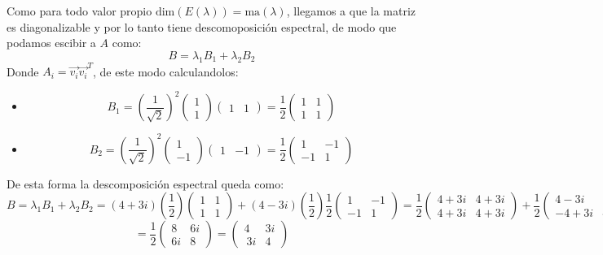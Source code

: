 \begin{itemize}
\begin{itemize}
        
    \end{itemize}
    Como para todo valor propio $\text{dim}(E(\lambda))=\text{ma}(\lambda)$, llegamos a que la matriz es diagonalizable y por lo tanto tiene descomoposici\'on espectral, de modo que podamos escibir a $A$ como:
    \[B=\lambda_1B_1+\lambda_2B_2\]
    Donde $A_i=\vec{v_i}\vec{v_i}^T$, de este modo calculandolos:
    \begin{itemize}
        \item \[B_1=\left(\frac{1}{\sqrt{2}}\right)^2\begin{pmatrix}1\\1\end{pmatrix}\begin{pmatrix}1&1\end{pmatrix}=\frac{1}{2}\begin{pmatrix}1&1\\1&1\end{pmatrix}\]
        \item \[B_2=\left(\frac{1}{\sqrt{2}}\right)^2\begin{pmatrix}1\\-1\end{pmatrix}\begin{pmatrix}1&-1\end{pmatrix}=\frac{1}{2}\begin{pmatrix}1&-1\\-1&1\end{pmatrix}\]
    \end{itemize}
    
    De esta forma la descomposición espectral queda como:\
    \[B=\lambda_1B_1+\lambda_2B_2=(4+3i)\left(\frac{1}{2}\right)\begin{pmatrix}1&1\\1&1\end{pmatrix}+(4-3i)\left(\frac{1}{2}\right)\frac{1}{2}\begin{pmatrix}1&-1\\-1&1\end{pmatrix}=\frac{1}{2}\begin{pmatrix}4+3i&4+3i\\4+3i&4+3i\end{pmatrix}+\frac{1}{2}\begin{pmatrix}4-3i&-4+3i\\-4+3i&4-3i\end{pmatrix}\]\[=\frac{1}{2}\begin{pmatrix}8&6i\\6i&8\end{pmatrix}=\begin{pmatrix}4&3i\\ \:3i&4\end{pmatrix}\]
    

\end{itemize}
